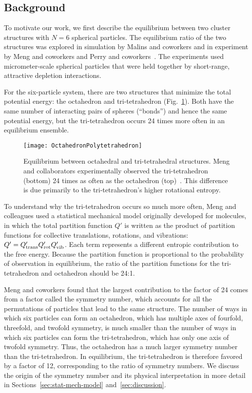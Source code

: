 \documentclass[pre, aps, twocolumn, reprint, amsmath,amssymb, showpacs,
superscriptaddress] {revtex4-1}
\begin{document}
\subsection{Background}
\label{sec:background}

To motivate our work, we first describe the equilibrium between two
cluster structures with $N=6$ spherical particles. The equilibrium ratio
of the two structures was explored in simulation by Malins and coworkers
\cite{malins_geometric_2009} and in experiment by Meng and coworkers
\cite{meng10} and Perry and coworkers~\cite{perry12}. The experiments
used micrometer-scale spherical particles that were held together by
short-range, attractive depletion interactions.

For the six-particle system, there are two structures that minimize the
total potential energy: the octahedron and tri-tetrahedron
(Fig.~\ref{fig:Octa-Poly}). Both have the same number of interacting
pairs of spheres (``bonds'') and hence the same potential energy, but
the tri-tetrahedron occurs 24 times more often in an equilibrium
ensemble.

\begin{figure}
  \begin{centering}
  \texttt{[image: OctahedronPolytetrahedron]}
  \caption{Equilibrium between octahedral and tri-tetrahedral
    structures. Meng and collaborators experimentally observed the
    tri-tetrahedron (bottom) 24 times as often as the octahedron
    (top)~\cite{meng10}. This difference is due primarily to the
    tri-tetrahedron's higher rotational entropy. \label{fig:Octa-Poly}}
  \end{centering}
\end{figure}

To understand why the tri-tetrahedron occurs so much more often, Meng
and colleagues used a statistical mechanical model originally developed
for molecules, in which the total partition function $Q'$ is written as
the product of partition functions for collective translations,
rotations, and vibrations: $Q' =
Q'_\textnormal{trans}Q'_\textnormal{rot}Q'_\textnormal{vib}$. Each term
represents a different entropic contribution to the free energy. Because
the partition function is proportional to the probability of observation
in equilibrium, the ratio of the partition functions for the
tri-tetrahedron and octahedron should be 24:1.

Meng and coworkers found that the largest contribution to the factor of
24 comes from a factor called the symmetry number, which accounts for
all the permutations of particles that lead to the same structure. The
number of ways in which six particles can form an octahedron, which has
multiple axes of fourfold, threefold, and twofold symmetry, is much
smaller than the number of ways in which six particles can form the
tri-tetrahedron, which has only one axis of twofold symmetry. Thus, the
octahedron has a much larger symmetry number than the tri-tetrahedron.
In equilibrium, the tri-tetrahedron is therefore favored by a factor of
12, corresponding to the ratio of symmetry numbers. We discuss the
origin of the symmetry number and its physical interpretation in more
detail in Sections~\ref{sec:stat-mech-model} and~\ref{sec:discussion}.
\end{document}
